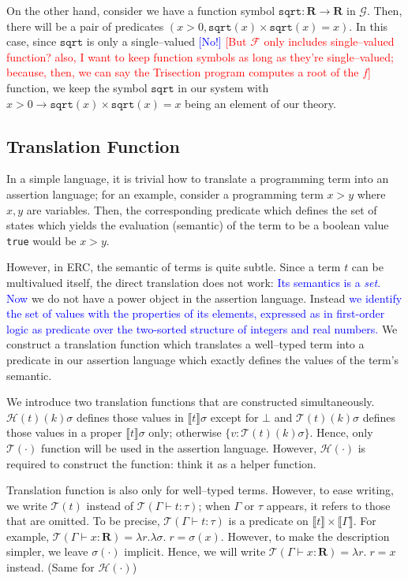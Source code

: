 \documentclass{article}
\newcommand{\Martin}[1]{\textcolor{blue}{#1}}
\newcommand{\Sewon}[1]{\textcolor{red}{#1}}
\newcommand{\dreal}{\textbf{R}}
\newcommand{\sem}[1]{\llbracket #1 \rrbracket }
\newcommand{\trans}[1]{\mathcal{T}( #1) }
\newcommand{\transh}[1]{\mathcal{H}( #1) }
\begin{document}
On the other hand, consider we have a function symbol 
 $\texttt{sqrt} : \dreal \to \dreal$ in $\mathcal{G}$. Then, 
there will be a pair of predicates $(x>0, \texttt{sqrt}(x) \times \texttt{sqrt}(x) = x)$.
In this case, since $\texttt{sqrt}$ is only a single--valued \Martin{[No!]} 
\Sewon{[But $\mathcal{F}$ only includes single--valued function?
also, I want to keep function symbols as long as they're single--valued; 
because, then, we can say the Trisection program computes a root of the $f$]} 
function, we keep the symbol 
$\texttt{sqrt}$ in our system with $x>0 \to \texttt{sqrt}(x) \times \texttt{sqrt}(x) = x$
being an element of our theory.

\subsection{Translation Function}
In a simple language, it is trivial how to translate a programming term into an assertion language;
for an example, consider a programming term $x>y$ where $x, y$ are variables. 
Then, the corresponding predicate which defines the set of states which yields the
evaluation (semantic) of the term to be a boolean value \texttt{true} would be $x>y$.

However, in ERC, the semantic of terms is quite subtle. 
Since a term $t$ can be multivalued itself, the direct translation does not work:
\Martin{Its semantics is a \emph{set}. Now}
we do not have a power object in the assertion language.
Instead \Martin{we identify the set of values with the properties
of its elements, expressed as in first-order logic as predicate 
over the two-sorted structure of integers and real numbers.}
We construct a translation function which 
translates a well--typed term into a predicate in our assertion language
which exactly defines the values of the term's semantic.

We introduce two translation functions that are constructed simultaneously.
$\transh{t}(k)\sigma$ defines those values in $\sem{t}\sigma$ except for $\bot$ and
$\trans{t}(k)\sigma$ defines those values in a proper $\sem{t}\sigma$ only; otherwise 
$\{v : \trans{t}(k)\sigma\}$. Hence, only $\trans{\cdot}$ function will be used in the 
assertion language. However, $\transh{\cdot}$ is required to construct the function:
think it as a helper function.

Translation function is also only for well--typed terms. However,
to ease writing, we write $\trans{t}$ instead of $\trans{\Gamma\vdash t : \tau}$;
when $\Gamma$ or $\tau$ appears, it refers to those that are omitted.
To be precise, $\trans{\Gamma\vdash t : \tau}$ is a predicate on $\sem{t}\times\sem{\Gamma}$.
For example, $\trans{\Gamma\vdash x : \dreal} = \lambda r.\lambda\sigma.\;r=\sigma(x)$.
However, to make the description simpler, we leave $\sigma(\cdot)$ implicit.
Hence, we will write
$\trans{\Gamma\vdash x : \dreal} = \lambda r.\;r=x$ instead. (Same for $\transh{\cdot}$)
\end{document}
